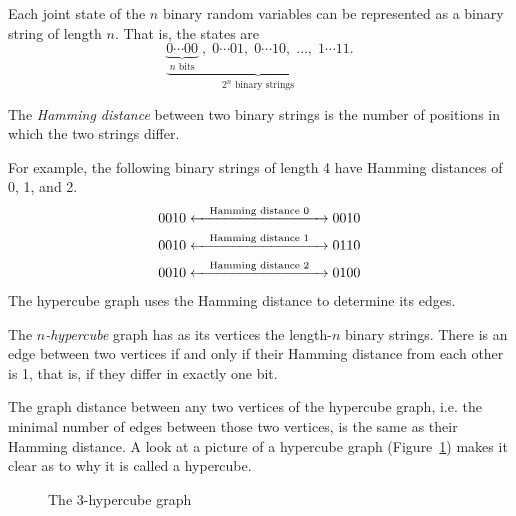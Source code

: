 \documentclass[cclicense]{hmcthesis}
\newcommand*{\x}[1]{\ensuremath{X^{(#1)}}}
\numberwithin{equation}{chapter}
\numberwithin{thmcounter}{chapter}
\begin{document}
    Each joint state of the $n$ binary random variables can be represented as a
    binary string of length $n$.  That is, the states are
    \[
        \underbrace{
        \underbrace{0\cdots00}_\text{$n$ bits}\;,\;
        0\cdots01,\;
        0\cdots10,\;
        \ldots,\;
        1\cdots11
        }_\text{$2^n$ binary strings}.
    \]
    \begin{definition}
    The \emph{Hamming distance} between two binary strings is the number of
    positions in which the two strings differ.  
    \end{definition}
    For example, the following binary strings of length 4 have Hamming distances
    of 0, 1, and 2.
    \begin{align*}
        0010 &\xleftrightarrow{\quad\text{Hamming distance $0$}\quad} 0010 \\
        0010 &\xleftrightarrow{\quad\text{Hamming distance $1$}\quad} 0110 \\
        0010 &\xleftrightarrow{\quad\text{Hamming distance $2$}\quad} 0100
    \end{align*}
    The hypercube graph uses the Hamming distance to determine its edges.
    \begin{definition}
        The \emph{$n$-hypercube} graph has as its vertices the length-$n$ binary
        strings.  There is an edge between two vertices if and only if
        their Hamming distance from each other is 1, that is, if they differ in
        exactly one bit.
    \end{definition}
    The graph distance between any two vertices of the hypercube graph, i.e. the
    minimal number of edges between those two vertices, is the same as their
    Hamming distance.  A look at a picture of a hypercube graph
    (Figure~\ref{fig:hypercube}) makes it clear as to why it is called a
    hypercube.


    \begin{figure}[h]
        \centering


        \caption{The $3$-hypercube graph}
        \label{fig:hypercube}
    \end{figure}
    
\end{document}
